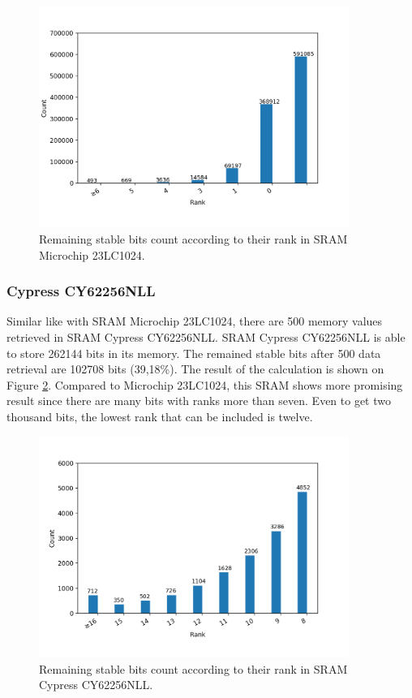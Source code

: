 \begin{figure}[tph!]
    \centerline{\includegraphics[width={0.9\textwidth}]{images/23lc1024_score_rank_bits}}
    \caption{Remaining stable bits count according to their rank in SRAM Microchip 23LC1024.}
    \label{fig:23lc1024_score_rank_bits}
\end{figure}

\subsubsection{Cypress CY62256NLL}
Similar like with SRAM Microchip 23LC1024, there are 500 memory values retrieved in SRAM Cypress CY62256NLL.
SRAM Cypress CY62256NLL is able to store 262144 bits in its memory. The remained stable bits after 500 data retrieval are 102708 bits (39,18\%).
The result of the calculation is shown on Figure \ref{fig:cy62256nll_score_rank_bits}. Compared to Microchip 23LC1024, this SRAM shows more promising result since there are many bits with ranks more than seven. Even to get two thousand bits, the lowest rank that can be included is twelve.

\begin{figure}[tph!]
    \centerline{\includegraphics[width={0.9\textwidth}]{images/cy62256nll_score_rank_bits}}
    \caption{Remaining stable bits count according to their rank in SRAM Cypress CY62256NLL.}
    \label{fig:cy62256nll_score_rank_bits}
\end{figure}

